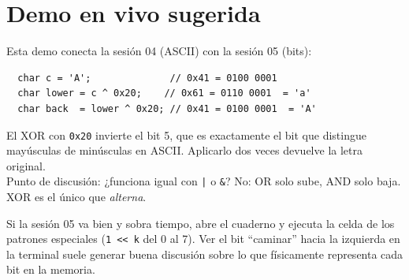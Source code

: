 \documentclass[12pt, oneside]{article}
\begin{document}
\section{Demo en vivo sugerida}

\begin{notaprofesor}
  Esta demo conecta la sesión 04 (ASCII) con la sesión 05 (bits):
  \begin{verbatim}
  char c = 'A';              // 0x41 = 0100 0001
  char lower = c ^ 0x20;    // 0x61 = 0110 0001  = 'a'
  char back  = lower ^ 0x20; // 0x41 = 0100 0001  = 'A'
  \end{verbatim}
  El XOR con \texttt{0x20} invierte el bit 5, que es exactamente el bit
  que distingue mayúsculas de minúsculas en ASCII.
  Aplicarlo dos veces devuelve la letra original.\\[4pt]
  Punto de discusión: ¿funciona igual con \texttt{|} o \texttt{\&}?
  No: OR solo sube, AND solo baja. XOR es el único que \textit{alterna}.
\end{notaprofesor}

\begin{notaprofesor}
  Si la sesión 05 va bien y sobra tiempo, abre el cuaderno y ejecuta la
  celda de los patrones especiales (\texttt{1 << k} del 0 al 7). Ver el bit
  ``caminar'' hacia la izquierda en la terminal suele generar buena discusión
  sobre lo que físicamente representa cada bit en la memoria.
\end{notaprofesor}
\end{document}

